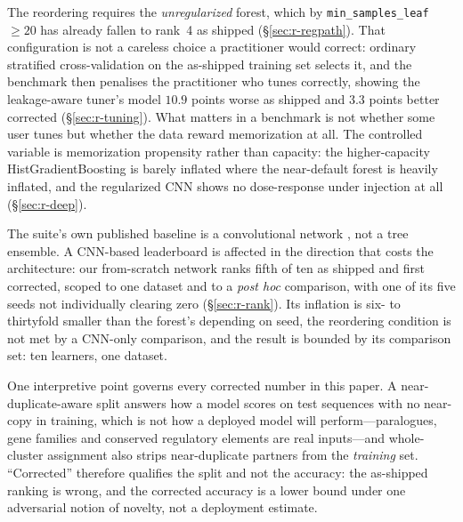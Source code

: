 \documentclass[webpdf,modern,large,namedate]{oup-authoring-template}%
\begin{document}
The reordering requires the \emph{unregularized} forest, which by \texttt{min\_samples\_leaf}$\ge20$ has already fallen to rank~4 as shipped (\S\ref{sec:r-regpath}). That configuration is not a careless choice a practitioner would correct: ordinary stratified cross-validation on the as-shipped training set selects it, and the benchmark then penalises the practitioner who tunes correctly, showing the leakage-aware tuner's model $10.9$ points worse as shipped and $3.3$ points better corrected (\S\ref{sec:r-tuning}). What matters in a benchmark is not whether some user tunes but whether the data reward memorization at all. The controlled variable is memorization propensity rather than capacity: the higher-capacity HistGradientBoosting is barely inflated where the near-default forest is heavily inflated, and the regularized CNN shows no dose-response under injection at all (\S\ref{sec:r-deep}).

The suite's own published baseline is a convolutional network \citep{gresova2023}, not a tree ensemble. A CNN-based leaderboard is affected in the direction that costs the architecture: our from-scratch network ranks fifth of ten as shipped and first corrected, scoped to one dataset and to a \emph{post hoc} comparison, with one of its five seeds not individually clearing zero (\S\ref{sec:r-rank}). Its inflation is six- to thirtyfold smaller than the forest's depending on seed, the reordering condition is not met by a CNN-only comparison, and the result is bounded by its comparison set: ten learners, one dataset.

One interpretive point governs every corrected number in this paper. A near-duplicate-aware split answers how a model scores on test sequences with no near-copy in training, which is not how a deployed model will perform---paralogues, gene families and conserved regulatory elements are real inputs---and whole-cluster assignment also strips near-duplicate partners from the \emph{training} set. ``Corrected'' therefore qualifies the split and not the accuracy: the as-shipped ranking is wrong, and the corrected accuracy is a lower bound under one adversarial notion of novelty, not a deployment estimate.
\end{document}
